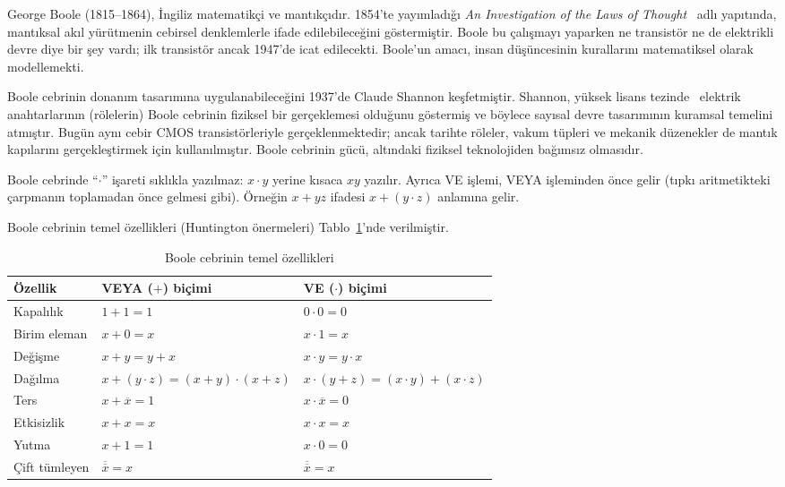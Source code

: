 \begin{bilginot}
George Boole (1815--1864), İngiliz matematikçi ve mantıkçıdır. 1854'te yayımladığı \emph{An Investigation of the Laws of Thought}~\cite{boole1854} adlı yapıtında, mantıksal akıl yürütmenin cebirsel denklemlerle ifade edilebileceğini göstermiştir. Boole bu çalışmayı yaparken ne transistör ne de elektrikli devre diye bir şey vardı; ilk transistör ancak 1947'de icat edilecekti. Boole'un amacı, insan düşüncesinin kurallarını matematiksel olarak modellemekti.

Boole cebrinin donanım tasarımına uygulanabileceğini 1937'de Claude Shannon keşfetmiştir. Shannon, yüksek lisans tezinde~\cite{shannon1937} elektrik anahtarlarının (rölelerin) Boole cebrinin fiziksel bir gerçeklemesi olduğunu göstermiş ve böylece sayısal devre tasarımının kuramsal temelini atmıştır. Bugün aynı cebir CMOS transistörleriyle gerçeklenmektedir; ancak tarihte röleler, vakum tüpleri ve mekanik düzenekler de mantık kapılarını gerçekleştirmek için kullanılmıştır. Boole cebrinin gücü, altındaki fiziksel teknolojiden bağımsız olmasıdır.
\end{bilginot}

\begin{bilginot}
Boole cebrinde ``$\cdot$'' işareti sıklıkla yazılmaz: $x \cdot y$ yerine kısaca $xy$ yazılır. Ayrıca VE işlemi, VEYA işleminden önce gelir (tıpkı aritmetikteki çarpmanın toplamadan önce gelmesi gibi). Örneğin $x + yz$ ifadesi $x + (y \cdot z)$ anlamına gelir.
\end{bilginot}

Boole cebrinin temel özellikleri (Huntington önermeleri) Tablo~\ref{tab:boole-ozellikleri}'nde verilmiştir.

\begin{table}[H]
\centering
\caption{Boole cebrinin temel özellikleri}
\label{tab:boole-ozellikleri}
\begin{tabular}{l l l}
\toprule
\textbf{Özellik} & \textbf{VEYA ($+$) biçimi} & \textbf{VE ($\cdot$) biçimi} \\
\midrule
Kapalılık      & $1 + 1 = 1$                          & $0 \cdot 0 = 0$ \\
Birim eleman   & $x + 0 = x$                          & $x \cdot 1 = x$ \\
Değişme        & $x + y = y + x$                      & $x \cdot y = y \cdot x$ \\
Dağılma        & $x + (y \cdot z) = (x+y) \cdot (x+z)$ & $x \cdot (y+z) = (x \cdot y) + (x \cdot z)$ \\
Ters           & $x + \overline{x} = 1$               & $x \cdot \overline{x} = 0$ \\
Etkisizlik     & $x + x = x$                          & $x \cdot x = x$ \\
Yutma          & $x + 1 = 1$                          & $x \cdot 0 = 0$ \\
Çift tümleyen  & $\overline{\overline{x}} = x$ & $\overline{\overline{x}} = x$ \\
\bottomrule
\end{tabular}
\end{table}

